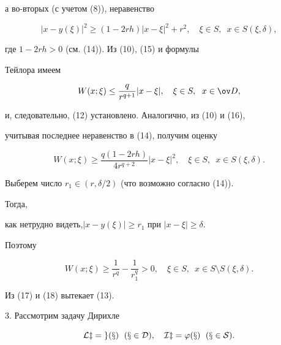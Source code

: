 \begin{pf}
а во-вторых (с учетом (8)), неравенство 


\begin{equation} 


|x-y(\xi)|^2\ge(1-2r h)|x-\xi|^2+r^2,\quad 


\xi\in S,\ \; x\in S(\xi,\delta), 


\end{equation} 


где $1-2r h>0$ (см. (14)). Из (10), (15) и формулы 


Тейлора имеем


$$ 


W(x;\xi)\le\frac{q}{r^{q+1}}|x-\xi|,\quad 


\xi\in S,\ \; x\in\ov D, 


$$ 


и, следовательно, (12) установлено. Аналогично, из (10) и (16), 


учитывая последнее неравенство в (14), получим оценку 


\begin{equation} 


W(x;\xi)\ge\frac{q(1-2r h)}{4r^{q+2}}|x-\xi|^2,\quad 


\xi\in S,\ \; x\in S(\xi,\delta). 


\end{equation} 


Выберем число $r_1\in(r,\delta/2)$ (что возможно согласно (14)). 


Тогда, 


как нетрудно видеть,\linebreak $|x-y(\xi)|\ge r_1$ при $|x-\xi|\ge\delta$. 


Поэтому 


\begin{equation} 


W(x;\xi)\ge\frac{1}{r^q}-\frac{1}{r^q_1}>0,\quad 


\xi\in S,\ \; x\in S\setminus S(\xi,\delta). 


\end{equation} 


Из (17) и (18) вытекает (13). 


\end{pf} 


 


3. Рассмотрим задачу Дирихле 


\begin{equation} 


\cal L z=g(x)\ \; (x\in D),\quad 


Iz=\varphi(x)\ \; (x\in S). 


\end{equation} 


